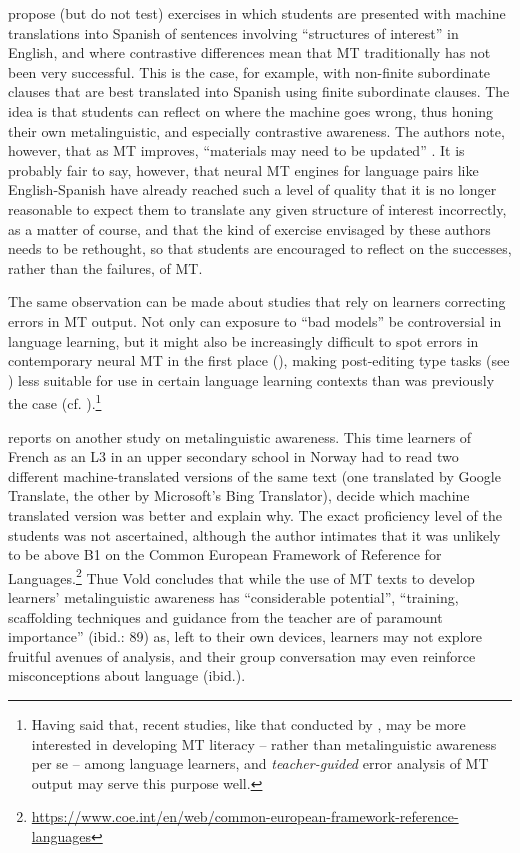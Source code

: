 \documentclass[output=paper,colorlinks,citecolor=brown,
]{langscibook}
\begin{document}
\citet{EnkinMejías-Bikandi2016} propose (but do not test) exercises in which students are presented with machine translations into Spanish of sentences involving “structures of interest” in English, and where contrastive differences mean that MT traditionally has not been very successful. This is the case, for example, with non-finite subordinate clauses that are best translated into Spanish using finite subordinate clauses. The idea is that students can reflect on where the machine goes wrong, thus honing their own metalinguistic, and especially contrastive awareness. The authors note, however, that as MT improves, “materials may need to be updated” \citep[145]{EnkinMejías-Bikandi2016}. It is probably fair to say, however, that neural MT engines for language pairs like English-Spanish have already reached such a level of quality that it is no longer reasonable to expect them to translate any given structure of interest incorrectly, as a matter of course, and that the kind of exercise envisaged by these authors needs to be rethought, so that students are encouraged to reflect on the successes, rather than the failures, of MT.\largerpage

The same observation can be made about studies that rely on learners correcting errors in MT output. Not only can exposure to “bad models” \citep{Niño2009} be controversial in language learning, but it might also be increasingly difficult to spot errors in contemporary neural MT in the first place (\citealt{CastilhoWay2017, LoockLéchauguette2021}), making post-editing type tasks (see ) less suitable for use in certain language learning contexts than was previously the case (cf. \citealt{ZhangTorres-Hostench2019}).\footnote{Having said that, recent studies, like that conducted by \citet{LoockLéchauguette2021}, may be more interested in developing MT literacy -- rather than metalinguistic awareness per se -- among language learners, and \textit{teacher-guided} error analysis of MT output may serve this purpose well.} 

\citet{ThueVold2018} reports on another study on metalinguistic awareness. This time learners of French as an L3 in an upper secondary school in Norway had to read two different machine-translated versions of the same text (one translated by Google Translate, the other by Microsoft’s Bing Translator), decide which machine translated version was better and explain why. The exact proficiency level of the students was not ascertained, although the author \citep[73]{ThueVold2018} intimates that it was unlikely to be above B1 on the Common European Framework of Reference for Languages.\footnote{\url{https://www.coe.int/en/web/common-european-framework-reference-languages}} Thue Vold concludes that while the use of MT texts to develop learners’ metalinguistic awareness has “considerable potential”, “training, scaffolding techniques and guidance from the teacher are of paramount importance” (ibid.: 89) as, left to their own devices, learners may not explore fruitful avenues of analysis, and their group conversation may even reinforce misconceptions about language (ibid.).
\end{document}
